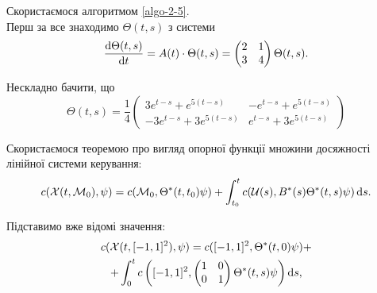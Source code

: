 \begin{solution}
	Скористаємося алгоритмом \ref{algo-2-5}. \\

	Перш за все знаходимо $\Theta(t,s)$ з системи \[ \frac{\mathop{}\!\mathrm{d} \Theta(t, s)}{\mathop{}\!\mathrm{d} t} = A(t) \cdot \Theta(t, s) = \begin{pmatrix} 2 & 1 \\ 3 & 4 \end{pmatrix} \Theta(t, s). \]

	Нескладно бачити, що \[ \Theta(t, s) = \frac{1}{4}
	\begin{pmatrix}
		3 e^{t - s} + e^{5 (t - s)} & - e^{t - s} + e^{5 (t - s)} \\ -3 e^{t - s} + 3 e^{5 (t - s)} & e^{t - s} + 3 e^{5 (t - s)}
	\end{pmatrix} 
	\]

	Скористаємося теоремою про вигляд опорної функції множини досяжності лінійної системи керування: \[ c(\mathcal{X}(t, \mathcal{M}_0), \psi) = c(\mathcal{M}_0, \Theta^*(t, t_0) \psi) + \int_{t_0}^t c(\mathcal{U}(s), B^*(s) \Theta^*(t, s) \psi) \mathop{}\!\mathrm{d} s. \]

	Підставимо вже відомі значення: \begin{multline*}  c(\mathcal{X}(t, [-1,1]^2), \psi) = c([-1,1]^2, \Theta^*(t, 0) \psi) + \\ + \int_0^t c\left([-1,1]^2, \begin{pmatrix} 1 & 0 \\ 0 & 1 \end{pmatrix} \Theta^*(t, s) \psi\right) \mathop{}\!\mathrm{d} s, \end{multline*}


\end{solution}

